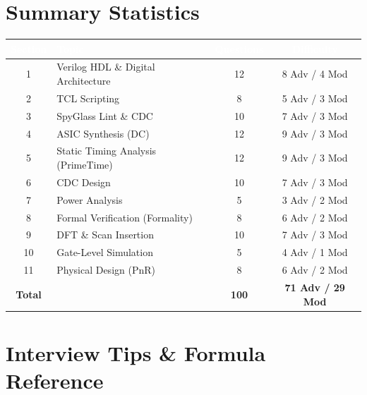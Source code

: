 \documentclass[12pt,a4paper]{article}
\begin{document}
\section*{Summary Statistics}

\begin{center}
\begin{longtable}{|c|l|c|c|}
\hline
\rowcolor{dkblue}
\textcolor{white}{\textbf{Section}} &
\textcolor{white}{\textbf{Topic}} &
\textcolor{white}{\textbf{Questions}} &
\textcolor{white}{\textbf{Difficulty}}\\
\hline\endhead
1  & Verilog HDL \& Digital Architecture & 12 & 8 Adv / 4 Mod\\
\hline
2  & TCL Scripting                        &  8 & 5 Adv / 3 Mod\\
\hline
3  & SpyGlass Lint \& CDC                 & 10 & 7 Adv / 3 Mod\\
\hline
4  & ASIC Synthesis (DC)                  & 12 & 9 Adv / 3 Mod\\
\hline
5  & Static Timing Analysis (PrimeTime)   & 12 & 9 Adv / 3 Mod\\
\hline
6  & CDC Design                           & 10 & 7 Adv / 3 Mod\\
\hline
7  & Power Analysis                       &  5 & 3 Adv / 2 Mod\\
\hline
8  & Formal Verification (Formality)      &  8 & 6 Adv / 2 Mod\\
\hline
9  & DFT \& Scan Insertion                & 10 & 7 Adv / 3 Mod\\
\hline
10 & Gate-Level Simulation                &  5 & 4 Adv / 1 Mod\\
\hline
11 & Physical Design (PnR)                &  8 & 6 Adv / 2 Mod\\
\hline
\rowcolor{dkblue!20}
\textbf{Total} & & \textbf{100} & \textbf{71 Adv / 29 Mod}\\
\hline
\end{longtable}
\end{center}

\section*{Interview Tips \& Formula Reference}
\end{document}
